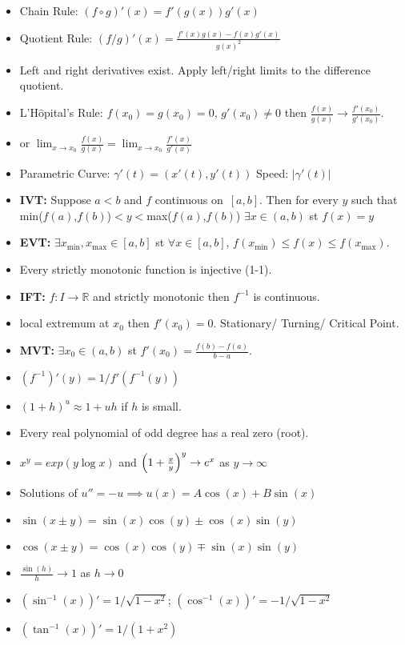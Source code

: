 \documentclass[10pt]{article}
\begin{document}
\begin{multicols}{2}
\begin{itemize}
    \item Chain Rule: $(f\circ g)'(x)=f'(g(x))g'(x)$
    \item Quotient Rule: $(f/g)'(x)=\frac{f'(x)g(x)-f(x)g'(x)}{g(x)^{2}}$
    \item Left and right derivatives exist. Apply left/right limits to the difference quotient.
    \item L'H$\hat{\text{o}}$pital's Rule: $f(x_{0})=g(x_{0})=0$, $g'(x_{0})\neq0$ then $\frac{f(x)}{g(x)}\to\frac{f'(x_{0})}{g'(x_{0})}$.
    \item or $\lim_{x\to x_{0}}\frac{f(x)}{g(x)}=\lim_{x\to x_{0}}\frac{f'(x)}{g'(x)}$
    \item Parametric Curve: $\gamma'(t)=(x'(t),y'(t))$ Speed: $|\gamma'(t)|$
    \item\textbf{IVT:} Suppose $a<b$ and $f$ continuous on~$[a,b]$. Then for every $y$ such that min($f(a)$,$f(b)$)$<y<$max($f(a)$,$f(b)$) $\exists x\in(a,b)$ st $f(x)=y$
    \item\textbf{EVT:} $\exists x_{\text{min}},x_{\text{max}}\in[a,b]$ st $\forall x\in[a,b]$, $f(x_{\text{min}})\leq f(x)\leq f(x_{\text{max}})$.
    \item Every strictly monotonic function is injective (1-1).
    \item\textbf{IFT:} $f:I\to\mathbb{R}$ and strictly monotonic then $f^{-1}$ is continuous.
    \item local extremum at $x_{0}$ then $f'(x_{0})=0$. Stationary/ Turning/ Critical Point.
    \item\textbf{MVT:} $\exists x_{0}\in(a,b)$ st $f'(x_{0})=\frac{f(b)-f(a)}{b-a}$.
    \item $(f^{-1})'(y)=1/f'(f^{-1}(y))$
    \item $(1+h)^{u}\approx1+uh$ if $h$ is small.
    \item Every real polynomial of odd degree has a real zero (root).
    \item $x^{y}=exp(y\log{x})$ and $\Big{(}1+\frac{x}{y}\Big{)}^{y}\to e^{x}$ as $y\to\infty$
    \item Solutions of $u''=-u\implies u(x)=A\cos(x)+B\sin(x)$
    \item $\sin(x\pm y)=\sin(x)\cos(y)\pm\cos(x)\sin(y)$
    \item $\cos(x\pm y)=\cos(x)\cos(y)\mp\sin(x)\sin(y)$
    \item $\frac{\sin(h)}{h}\to1$ as $h\to 0$
    \item $(\sin^{-1}(x))'=1/\sqrt{1-x^{2}}$; $(\cos^{-1}(x))'=-1/\sqrt{1-x^{2}}$
    \item $(\tan^{-1}(x))'=1/(1+x^{2})$

\end{itemize}
\end{multicols}
\end{document}
